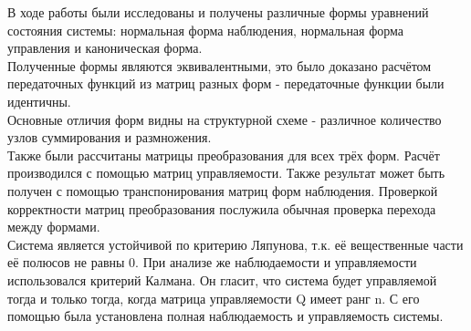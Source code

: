 \documentclass[14pt,a4paper,report]{report}
\begin{document}
В ходе работы были исследованы  и получены различные формы уравнений состояния системы: нормальная форма наблюдения, нормальная форма управления и каноническая форма.\\
Полученные формы являются эквивалентными, это было доказано расчётом передаточных функций из матриц разных форм - передаточные функции были идентичны.\\
Основные отличия форм видны на структурной схеме - различное количество узлов суммирования и размножения.\\
Также были рассчитаны матрицы преобразования для всех трёх форм. Расчёт производился с помощью матриц управляемости. Также результат может быть получен с помощью транспонирования матриц форм наблюдения. Проверкой корректности матриц преобразования послужила обычная проверка перехода между формами.\\
Система является устойчивой по критерию Ляпунова, т.к. её вещественные части её полюсов не равны 0. При анализе же наблюдаемости и управляемости использовался критерий Калмана. Он гласит, что система будет управляемой тогда и только тогда, когда матрица управляемости Q имеет ранг n. С его помощью была установлена полная наблюдаемость и управляемость системы. 
\end{document}
